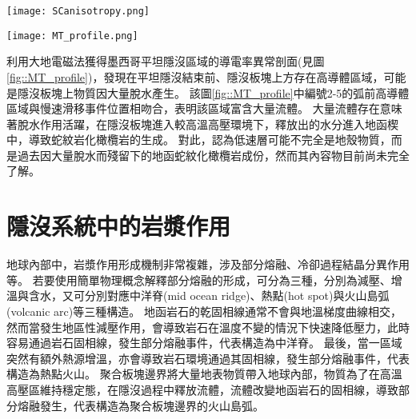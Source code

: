 \begin{figure*}[ht!]
    \centering
    \texttt{[image: SCanisotropy.png]}
    \caption[墨西哥隱沒帶板塊介面附近剪切帶結構示意圖，摘自\citealp{Song2012SC}]{墨西哥隱沒帶板塊介面附近剪切帶結構示意圖，摘自\citealp{Song2012SC}。大地震主要發生在鎖定區(locked zone)和脆性(brittle)變形區域。慢速滑移事件(slow-slip event)主要發生在過渡帶(transition zone)和半韌性區域(seni-ductile regime)，Vs非常低，且非均向性極強。岩石流變轉換由350$^{\circ}$等溫線(淺藍色線)分開，導致應力梯度形成且方向與黏土礦物中流體壓力相反，導致低速帶的形成。這些低速帶流體導致板塊介面處於弱耦合狀態，並且主導該地區慢速滑移事件的生成。
    }
    \label{fig::SCanisotorpy2012}
\end{figure*}


\begin{figure*}[ht!]
    \centering
    \texttt{[image: MT\_profile.png]}
    \caption[墨西哥平坦隱沒區域的導電率異常剖面圖與解釋圖，摘自\citealp{MT2006}]{墨西哥平坦隱沒區域的導電率異常剖面圖與解釋圖，摘自\citealp{MT2006}。上圖為電阻率異常結果剖面，所繪之隱沒板塊位置參考自\citealp{pardo1995}結果，最上方標示跨墨西哥火山帶的範圍。圖中每個數字圈皆代表隱沒帶上岩石發生向變後脫水的位置。下圖為電阻異常解釋圖，綠色區域為電阻異常低區(<100 $\Omega m$)。在平坦隱沒段結束處有多個岩石相變事件發生，隱沒板塊上出現大範圍導體。
    }
    \label{fig::MT_profile}
\end{figure*}

\citealp{MT2006}利用大地電磁法獲得墨西哥平坦隱沒區域的導電率異常剖面(見圖\ref{fig::MT_profile})，發現在平坦隱沒結束前、隱沒板塊上方存在高導體區域，可能是隱沒板塊上物質因大量脫水產生。
該圖\ref{fig::MT_profile}中編號2-5的弧前高導體區域與慢速滑移事件位置相吻合，表明該區域富含大量流體。
大量流體存在意味著脫水作用活躍，在隱沒板塊進入較高溫高壓環境下，釋放出的水分進入地函楔中，導致蛇紋岩化橄欖岩的生成。
對此，\citealp{Manea2013}認為低速層可能不完全是地殼物質，而是過去因大量脫水而殘留下的地函蛇紋化橄欖岩成份，然而其內容物目前尚未完全了解。

\section{隱沒系統中的岩漿作用}\label{隱沒系統中的岩漿作用}
地球內部中，岩漿作用形成機制非常複雜，涉及部分熔融、冷卻過程結晶分異作用等。
若要使用簡單物理概念解釋部分熔融的形成，可分為三種，分別為減壓、增溫與含水，又可分別對應中洋脊(mid ocean ridge)、熱點(hot spot)與火山島弧(volcanic arc)等三種構造。
地函岩石的乾固相線通常不會與地溫梯度曲線相交，然而當發生地區性減壓作用，會導致岩石在溫度不變的情況下快速降低壓力，此時容易通過岩石固相線，發生部分熔融事件，代表構造為中洋脊。
最後，當一區域突然有額外熱源增溫，亦會導致岩石環境通過其固相線，發生部分熔融事件，代表構造為熱點火山。
聚合板塊邊界將大量地表物質帶入地球內部，物質為了在高溫高壓區維持穩定態，在隱沒過程中釋放流體，流體改變地函岩石的固相線，導致部分熔融發生，代表構造為聚合板塊邊界的火山島弧。

